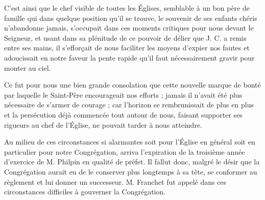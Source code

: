 C'est ainsi que le chef visible de toutes les Églises, semblable à un bon père de famille qui dans quelque position qu'il
se trouve, le souvenir de ses enfants chéris n'abandonne jamais, s'occupait dans ces moments critiques pour nous devant le Seigneur, et usant dans sa plénitude de ce pouvoir de délier que J. C. a remis entre ses mains, il s'efforçait de nous faciliter les moyens d'expier nos fautes et adoucissait en notre faveur la pente rapide qu'il faut nécessairement gravir pour monter au ciel.

Ce fut pour nous une bien grande consolation que cette nouvelle marque de bonté par laquelle le Saint-Père encourageait nos efforts ; jamais il n'avait été plus nécessaire de s'armer de courage ; car l'horizon se rembrunissait de plus en plus et la persécution déjà commencée tout autour de nous, faisant supporter ses rigueurs au chef de l'Église, ne pouvait tarder à nous atteindre.

Au milieu de ces circonstances si alarmantes soit pour l'Église en général soit en particulier pour notre Congrégation, arriva l'expiration de la troisième année d'exercice de M. Philpin en qualité de préfet. Il fallut donc, malgré le désir que la Congrégation aurait eu de le conserver plus longtemps à sa tête, se conformer au règlement et lui donner un successeur. M. Franchet fut appelé dans ces circonstances difficiles à gouverner la Congrégation.
